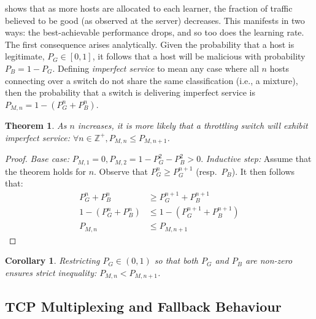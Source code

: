 \documentclass[conference, letterpaper, 10pt, times]{IEEEtran}
\newtheorem{thm}{Theorem}
\newtheorem{corr}{Corollary}[thm]
\begin{document}
 shows that as more hosts are allocated to each learner, the fraction of traffic believed to be good (as observed at the server) decreases.
This manifests in two ways: the best-achievable performance drops, and so too does the learning rate.
The first consequence arises analytically.
Given the probability that a host is legitimate, $P_G \in [0,1]$, it follows that a host will be malicious with probability $P_B = 1 - P_G$.
Defining \emph{imperfect service} to mean any case where all $n$ hosts connecting over a switch do not share the same classification (i.e., a mixture), then the probability that a switch is delivering imperfect service is $P_{M,n} = 1 - (P_G^n + P_B^n)$.
\begin{thm}
	As $n$ increases, it is more likely that a throttling switch will exhibit imperfect service: $\forall n \in \mathbb{Z}^{+}, P_{M,n} \le P_{M,n+1}$.
\end{thm}
\begin{proof}
	\emph{Base case:} $P_{M,1}=0, P_{M,2} = 1 - P_G^2 - P_B^2 > 0$.
	\emph{Inductive step:} Assume that the theorem holds for $n$. Observe that $P_G^n \ge P_G^{n+1}$ (resp.\ $P_B$). It then follows that:
	\begin{align*}
	P_G^n + P_B^n &\ge P_G^{n+1} + P_B^{n+1}\\
	1 - (P_G^n + P_B^n) &\le 1 - (P_G^{n+1} + P_B^{n+1})\\
	P_{M,n} &\le P_{M,n+1}
	\end{align*}
\end{proof}
\begin{corr}
	Restricting $P_G \in (0,1)$ so that both $P_G$ and $P_B$ are non-zero ensures strict inequality: $P_{M,n} < P_{M,n+1}$.
\end{corr}


\subsection{TCP Multiplexing and Fallback Behaviour}\label{sec:tcp-multiplexing-and-fallback-behaviour}

\end{document}
